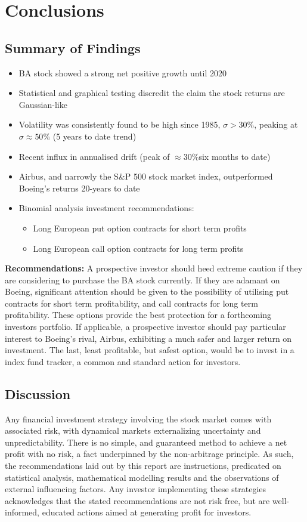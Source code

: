 \documentclass[
	a4paper, %
	11pt, %
	twoside, %
]{LTJournalArticle}
\begin{document}
\section{Conclusions}
\subsection{Summary of Findings}
\begin{itemize}
	\item BA stock showed a strong net positive growth until 2020
	\item Statistical and graphical testing discredit the claim the stock returns are Gaussian-like
	\item Volatility was consistently found to be high since 1985, $\sigma>30\%$, peaking at $\sigma\approx50\%$ (5 years to date trend)
	\item Recent influx in annualised drift (peak of $\approx30\% $six months to date)
	\item Airbus, and narrowly the S\&P 500 stock market index, outperformed Boeing's returns 20-years to date
	\item Binomial analysis investment recommendations:
	\begin{itemize}
		\item Long European put option contracts for short term profits
		\item Long European call option contracts for long term profits
	\end{itemize}
\end{itemize}

\noindent\textbf{Recommendations:} A prospective investor should heed extreme caution if they are considering to purchase the BA stock currently.
If they are adamant on Boeing, significant attention should be given to the possibility of utilising put contracts for short term profitability, and call contracts for long term profitability.
These options provide the best protection for a forthcoming investors portfolio.
If applicable, a prospective investor should pay particular interest to Boeing's rival, Airbus, exhibiting a much safer and larger return on investment.
The last, least profitable, but safest option, would be to invest in a index fund tracker, a common and standard action for investors.

\subsection{Discussion}
Any financial investment strategy involving the stock market comes with associated risk, with dynamical markets externalizing uncertainty and unpredictability.
There is no simple, and guaranteed method to achieve a net profit with no risk, a fact underpinned by the non-arbitrage principle.
As such, the recommendations laid out by this report are instructions, predicated on statistical analysis, mathematical modelling results and the observations of external influencing factors.
Any investor implementing these strategies acknowledges that the stated recommendations are not risk free, but are well-informed, educated actions aimed at generating profit for investors.
\end{document}
